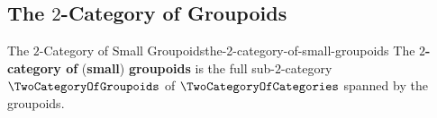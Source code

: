 \subsection{The $2$-Category of Groupoids}\label{subsection-the-2-category-of-groupoids}
\begin{definition}{The $2$-Category of Small Groupoids}{the-2-category-of-small-groupoids}%
    The \textbf{$2$-category of} (\textbf{small}) \textbf{groupoids} is the full sub-$2$-category $\TwoCategoryOfGroupoids$ of $\TwoCategoryOfCategories$ spanned by the groupoids.
\end{definition}
\begin{appendices}

\end{appendices}

